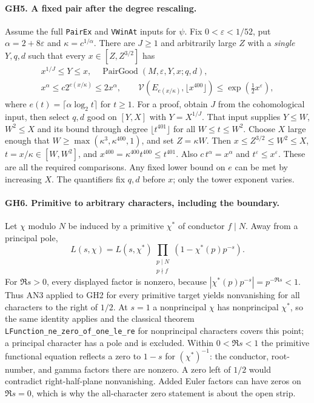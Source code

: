 \paragraph{GH5. A fixed pair after the degree rescaling.}
Assume the full \texttt{PairEx} and \texttt{VWinAt} inputs for $\psi$.
Fix $0<\varepsilon<1/52$, put $\alpha=2+8\varepsilon$ and
$\kappa=c^{1/\alpha}$.  There are $J\ge1$ and arbitrarily large $Z$
with a \emph{single} $Y,q,d$ such that every $x\in[Z,Z^{3/2}]$ has
\[
 \begin{gathered}
 x^{1/J}\le Y\le x,\quad \operatorname{PairGood}(M,\varepsilon,Y,x;q,d),\\
 x^\alpha\le c2^{e(x/\kappa)}\le2x^\alpha,\qquad
 \mathcal V(E_{e(x/\kappa)},\lfloor x^{400}\rfloor)
       \le\exp(\tfrac12x^\varepsilon),
 \end{gathered}                                                    \tag{GH5}
\]
where $e(t)=\lceil\alpha\log_2t\rceil$ for $t\ge1$.
For a proof, obtain $J$ from the cohomological input, then select
$q,d$ good on $[Y,X]$ with $Y=X^{1/J}$.  That input supplies
$Y\le W$, $W^2\le X$ and its bound through degree $\lfloor t^{401}\rfloor$
for all $W\le t\le W^2$.  Choose $X$ large enough that
$W\ge\max(\kappa^3,\kappa^{400},1)$, and set $Z=\kappa W$.
Then $x\le Z^{3/2}\le W^2\le X$, $t=x/\kappa\in[W,W^2]$, and
$x^{400}=\kappa^{400}t^{400}\le t^{401}$.
Also $c\,t^\alpha=x^\alpha$ and $t^\varepsilon\le x^\varepsilon$.
These are all the required comparisons.  Any fixed lower bound on $e$
can be met by increasing $X$.  The quantifiers fix $q,d$ before $x$;
only the tower exponent varies.

\paragraph{GH6. Primitive to arbitrary characters, including the boundary.}
Let $\chi$ modulo $N$ be induced by a primitive $\chi^*$ of conductor
$f\mid N$.  Away from a principal pole,
\[
 L(s,\chi)=L(s,\chi^*)
       \prod_{\substack{p\mid N\\p\nmid f}}
             (1-\chi^*(p)p^{-s}).                         \tag{GH6}
\]
For $\Re s>0$, every displayed factor is nonzero, because
$|\chi^*(p)p^{-s}|=p^{-\Re s}<1$.
Thus AN3 applied to GH2 for every primitive target yields nonvanishing
for all characters to the right of $1/2$.  At $s=1$ a nonprincipal
$\chi$ has nonprincipal $\chi^*$, so the same identity applies and
the classical theorem \texttt{LFunction\_ne\_zero\_of\_one\_le\_re}
for nonprincipal characters covers this point; a principal character
has a pole and is excluded.  Within $0<\Re s<1$ the primitive functional
equation reflects a zero to $1-s$ for $(\chi^*)^{-1}$: the conductor,
root-number, and gamma factors there are nonzero.  A zero left of
$1/2$ would contradict right-half-plane nonvanishing.  Added Euler
factors can have zeros on $\Re s=0$, which is why the all-character
zero statement is about the open strip.

